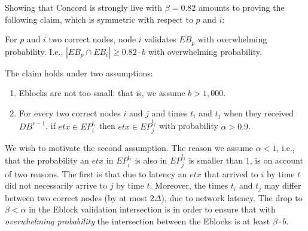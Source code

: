 Showing that Concord is strongly live with $\beta=0.82$ amounts to proving the following claim, which is symmetric with respect to $p$ and $i$:
\begin{claim} {}For $p$ and $i$ two correct nodes, node $i$ validates $EB_p$ with overwhelming probability. I.e., $|EB_p\cap EB_i|\geq 0.82\cdot b$ with overwhelming probability.
\end{claim}
The claim holds under two assumptions:
\begin{enumerate}
\item Eblocks are not too small: that is, we assume $b>1,000$.
\item For every two correct nodes $i$ and $j$ and times $t_i$ and $t_j$ when they received $DB^{r-1}$, if $etx\in EP_i^{t_i}$ then $etx\in EP_j^{t_j}$ with probability $\alpha>0.9$. \label{rep:assumption2}
\end{enumerate}	
We wish to motivate the second assumption. The reason we assume $\alpha<1$, i.e., that the probability an $etx$ in $EP^{t_i}_i$ is also in $EP_j^{t_j}$ is smaller than $1$, is on account of two reasons. The first is that due to latency an $etx$ that arrived to $i$ by time $t$ did not necessarily arrive to $j$ by time $t$. Moreover, the times $t_i$ and $t_j$ may differ between two correct nodes (by at most $2\Delta$), due to network latency.
The drop to $\beta<\alpha$ in the Eblock validation intersection is in order to ensure that with \emph{overwhelming probability} the intersection between the Eblocks is at least $\beta\cdot b$.

